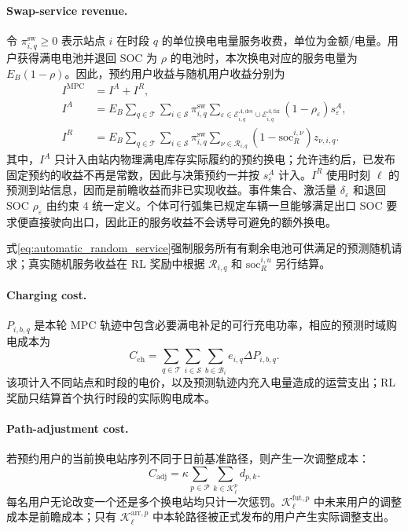 \documentclass[12pt,a4paper,UTF8]{ctexart}
\begin{document}
\paragraph{Swap-service revenue.}
令 $\pi_{i,q}^{\mathrm{sw}}\ge0$ 表示站点 $i$ 在时段 $q$ 的单位换电电量服务收费，单位为金额/电量。用户获得满电电池并退回 SOC 为 $\rho$ 的电池时，本次换电对应的服务电量为 $E_B(1-\rho)$。因此，预约用户收益与随机用户收益分别为
\begin{equation}
\begin{aligned}
I^{\mathrm{MPC}}&=I^{A}+I^{R},\\
I^{A}
&=E_B\sum_{q\in\mathcal T}
\sum_{i\in\mathcal S}\pi_{i,q}^{\mathrm{sw}}
\sum_{\varepsilon\in
\mathcal E_{i,q}^{A,\mathrm{dec}}\cup
\mathcal E_{i,q}^{A,\mathrm{fix}}}
(1-\rho_\varepsilon)s_\varepsilon^A,\\
I^{R}
&=E_B\sum_{q\in\mathcal T}
\sum_{i\in\mathcal S}\pi_{i,q}^{\mathrm{sw}}
\sum_{\nu\in\mathcal R_{i,q}}
(1-\mathrm{soc}_{R}^{i,\nu})
z_{\nu,i,q}.
\end{aligned}
\label{eq:income}
\end{equation}
其中，$I^{A}$ 只计入由站内物理满电库存实际履约的预约换电；允许违约后，已发布固定预约的收益不再是常数，因此与决策预约一并按 $s_\varepsilon^A$ 计入。$I^{R}$ 使用时刻 $\ell$ 的预测到站信息，因而是前瞻收益而非已实现收益。事件集合、激活量 $\delta_\varepsilon$ 和退回 SOC $\rho_\varepsilon$ 由约束 4 统一定义。个体可行弧集已规定车辆一旦能够满足出口 SOC 要求便直接驶向出口，因此正的服务收益不会诱导可避免的额外换电。

式\eqref{eq:automatic_random_service}强制服务所有有剩余电池可供满足的预测随机请求；真实随机服务收益在 RL 奖励中根据 $\mathcal R_{i,q}$ 和 $\mathrm{soc}_R^{i,u}$ 另行结算。

\paragraph{Charging cost.}
$P_{i,b,q}$ 是本轮 MPC 轨迹中包含必要满电补足的可行充电功率，相应的预测时域购电成本为
\begin{equation}
C_{\mathrm{ch}}
=
\sum_{q\in\mathcal T}
\sum_{i\in\mathcal S}
\sum_{b\in\mathcal B_i}
e_{i,q}\Delta P_{i,b,q}.
\label{eq:chargingcost}
\end{equation}
该项计入不同站点和时段的电价，以及预测轨迹内充入电量造成的运营支出；RL 奖励只结算首个执行时段的实际购电成本。

\paragraph{Path-adjustment cost.}
若预约用户的当前换电站序列不同于日前基准路径，则产生一次调整成本：
\begin{equation}
C_{\mathrm{adj}}
=
\kappa
\sum_{p\in\mathcal P}
\sum_{k\in\mathcal K_\ell^p}
d_{p,k}.
\label{eq:adjustment_cost}
\end{equation}
每名用户无论改变一个还是多个换电站均只计一次惩罚。$\mathcal K_\ell^{\mathrm{fut},p}$ 中未来用户的调整成本是前瞻成本；只有
$\mathcal K_\ell^{\mathrm{arr},p}$ 中本轮路径被正式发布的用户产生实际调整支出。
\end{document}
